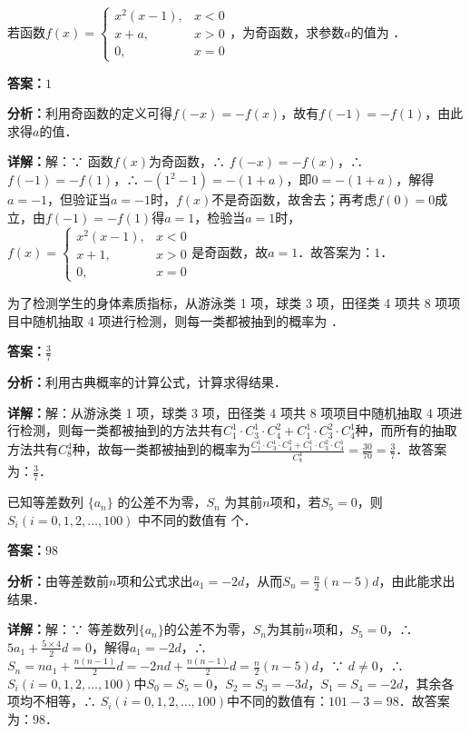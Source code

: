 \begin{question}[points=5]
若函数$f(x)=\begin{cases} x^2(x-1), & x<0 \\ x+a, & x>0 \\ 0, & x=0 \end{cases}$，为奇函数，求参数$a$的值为 ．
\fillin[{$1$}]
\begin{solution}
\textbf{答案：}$1$

\textbf{分析：}利用奇函数的定义可得$f(-x)=-f(x)$，故有$f(-1)=-f(1)$，由此求得$a$的值．

\textbf{详解：}解：∵ 函数$f(x)$为奇函数，∴ $f(-x)=-f(x)$，∴ $f(-1)=-f(1)$，∴ $-(1^2-1)=-(1+a)$，即$0=-(1+a)$，解得$a=-1$，但验证当$a=-1$时，$f(x)$不是奇函数，故舍去；再考虑$f(0)=0$成立，由$f(-1)=-f(1)$得$a=1$，检验当$a=1$时，$f(x)=\begin{cases} x^2(x-1), & x<0 \\ x+1, & x>0 \\ 0, & x=0 \end{cases}$是奇函数，故$a=1$．故答案为：$1$．
\end{solution}
\end{question}

\begin{question}[points=5]
为了检测学生的身体素质指标，从游泳类 1 项，球类 3 项，田径类 4 项共 8 项项目中随机抽取 4 项进行检测，则每一类都被抽到的概率为 ．
\fillin[{$\frac{3}{7}$}]
\begin{solution}
\textbf{答案：}$\frac{3}{7}$

\textbf{分析：}利用古典概率的计算公式，计算求得结果．

\textbf{详解：}解：从游泳类 1 项，球类 3 项，田径类 4 项共 8 项项目中随机抽取 4 项进行检测，则每一类都被抽到的方法共有$C_1^1\cdot C_3^1\cdot C_4^2 + C_1^1\cdot C_3^2\cdot C_4^1$种，而所有的抽取方法共有$C_8^4$种，故每一类都被抽到的概率为$\frac{C_1^1\cdot C_3^1\cdot C_4^2 + C_1^1\cdot C_3^2\cdot C_4^1}{C_8^4}=\frac{30}{70}=\frac{3}{7}$．故答案为：$\frac{3}{7}$．
\end{solution}
\end{question}

\begin{question}[points=5]
已知等差数列 $\{a_n\}$ 的公差不为零，$S_n$ 为其前$n$项和，若$S_5 = 0$，则$S_i (i = 0,1,2,\ldots,100)$ 中不同的数值有  个．
\fillin[{$98$}]
\begin{solution}
\textbf{答案：}$98$

\textbf{分析：}由等差数前$n$项和公式求出$a_1=-2d$，从而$S_n=\frac{n}{2}(n-5)d$，由此能求出结果．

\textbf{详解：}解：∵ 等差数列$\{a_n\}$的公差不为零，$S_n$为其前$n$项和，$S_5=0$，∴ $5a_1+\frac{5\times4}{2}d=0$，解得$a_1=-2d$，∴ $S_n=na_1+\frac{n(n-1)}{2}d=-2nd+\frac{n(n-1)}{2}d=\frac{n}{2}(n-5)d$，∵ $d\neq0$，∴ $S_i(i=0,1,2,\ldots,100)$中$S_0=S_5=0$，$S_2=S_3=-3d$，$S_1=S_4=-2d$，其余各项均不相等，∴ $S_i(i=0,1,2,\ldots,100)$中不同的数值有：$101-3=98$．故答案为：$98$．
\end{solution}
\end{question}


